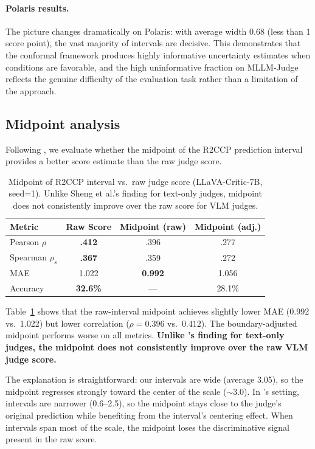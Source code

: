 \documentclass{article}
\begin{document}
\paragraph{Polaris results.} The picture changes dramatically on Polaris: with average width 0.68 (less than 1 score point), the vast majority of intervals are decisive. This demonstrates that the conformal framework produces highly informative uncertainty estimates when conditions are favorable, and the high uninformative fraction on MLLM-Judge reflects the genuine difficulty of the evaluation task rather than a limitation of the approach.

\subsection{Midpoint analysis}
\label{sec:midpoint}

Following \citet{sheng2025analyzing}, we evaluate whether the midpoint of the R2CCP prediction interval provides a better score estimate than the raw judge score.

\begin{table}[t]
\centering
\caption{Midpoint of R2CCP interval vs.\ raw judge score (LLaVA-Critic-7B, seed=1). Unlike Sheng et al.'s finding for text-only judges, midpoint does not consistently improve over the raw score for VLM judges.}
\label{tab:midpoint}
\small
\begin{tabular}{lccc}
\toprule
\textbf{Metric} & \textbf{Raw Score} & \textbf{Midpoint (raw)} & \textbf{Midpoint (adj.)} \\
\midrule
Pearson $\rho$ & \textbf{.412} & .396 & .277 \\
Spearman $\rho_s$ & \textbf{.367} & .359 & .272 \\
MAE & 1.022 & \textbf{0.992} & 1.056 \\
Accuracy & \textbf{32.6\%} & --- & 28.1\% \\
\bottomrule
\end{tabular}
\end{table}

Table~\ref{tab:midpoint} shows that the raw-interval midpoint achieves slightly lower MAE (0.992 vs.\ 1.022) but lower correlation ($\rho = 0.396$ vs.\ $0.412$). The boundary-adjusted midpoint performs worse on all metrics. \textbf{Unlike \citet{sheng2025analyzing}'s finding for text-only judges, the midpoint does not consistently improve over the raw VLM judge score.}

The explanation is straightforward: our intervals are wide (average 3.05), so the midpoint regresses strongly toward the center of the scale (${\sim}3.0$). In \citet{sheng2025analyzing}'s setting, intervals are narrower (0.6--2.5), so the midpoint stays close to the judge's original prediction while benefiting from the interval's centering effect. When intervals span most of the scale, the midpoint loses the discriminative signal present in the raw score.
\end{document}
